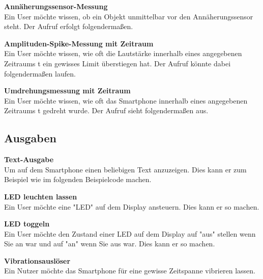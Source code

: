 \documentclass[11pt,a4paper]{report}
\begin{document}
\textbf{Annäherungssensor-Messung}\\
Ein User möchte wissen, ob ein Objekt unmittelbar vor den Annäherungssensor steht.
Der Aufruf erfolgt folgendermaßen.


\textbf{Amplituden-Spike-Messung mit Zeitraum}\\
Ein User möchte wissen, wie oft die Lautstärke innerhalb eines angegebenen Zeitraums t ein gewisses Limit überstiegen hat.
Der Aufruf könnte dabei folgendermaßen laufen.



\textbf{Umdrehungsmessung mit Zeitraum}\\
Ein User möchte wissen, wie oft das Smartphone innerhalb eines angegebenen Zeitraums t gedreht wurde.
Der Aufruf sieht folgendermaßen aus.



\subsection*{Ausgaben}\label{subsec:Ausgaben}

\textbf{Text-Ausgabe}\\
Um auf dem Smartphone einen beliebigen Text anzuzeigen.
Dies kann er zum Beispiel wie im folgenden Beispielcode machen.


\textbf{LED leuchten lassen}\\
Ein User möchte eine "LED" auf dem Display ansteuern.
Dies kann er so machen.


\textbf{LED toggeln}\\
Ein User möchte den Zustand einer LED auf dem Display auf "aus" stellen wenn Sie an war und auf "an" wenn Sie aus war.
Dies kann er so machen.


\textbf{Vibrationsauslöser}\\
Ein Nutzer möchte das Smartphone für eine gewisse Zeitspanne vibrieren lassen.

\end{document}
